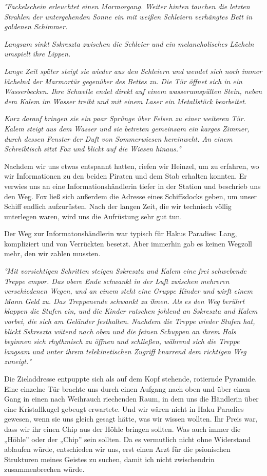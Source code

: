\documentclass[11pt]{scrartcl}
\begin{document}
\emph{°Fackelschein erleuchtet einen Marmorgang. Weiter hinten tauchen
die letzten Strahlen der untergehenden Sonne ein mit weißen Schleiern
verhängtes Bett in goldenen Schimmer.}

\emph{Langsam sinkt Sskreszta zwischen die Schleier und ein
melancholisches Lächeln umspielt ihre Lippen.}

\emph{Lange Zeit später steigt sie wieder aus den Schleiern und wendet
sich noch immer lächelnd der Marmortür gegenüber des Bettes zu. Die Tür
öffnet sich in ein Wasserbecken. Ihre Schwelle endet direkt auf einem
wasserumspülten Stein, neben dem Kalem im Wasser treibt und mit einem
Laser ein Metallstück bearbeitet.}

\emph{Kurz darauf bringen sie ein paar Sprünge über Felsen zu einer
weiteren Tür. Kalem steigt aus dem Wasser und sie betreten gemeinsam ein
karges Zimmer, durch dessen Fenster der Duft von Sommerwiesen
hereinweht. An einem Schreibtisch sitzt Fox und blickt auf die Wiesen
hinaus.°}

Nachdem wir uns etwas entspannt hatten, riefen wir Heinzel, um zu
erfahren, wo wir Informationen zu den beiden Piraten und dem Stab
erhalten konnten. Er verwies uns an eine Informationshändlerin tiefer in
der Station und beschrieb uns den Weg. Fox ließ sich außerdem die
Adresse eines Schiffsdocks geben, um unser Schiff endlich aufzurüsten.
Nach der langen Zeit, die wir technisch völlig unterlegen waren, wird
uns die Aufrüstung sehr gut tun.

Der Weg zur Informatonshändlerin war typisch für Hakus Paradies: Lang,
kompliziert und von Verrückten besetzt. Aber immerhin gab es keinen
Wegzoll mehr, den wir zahlen mussten.

\emph{°Mit vorsichtigen Schritten steigen Sskreszta und Kalem eine frei
schwebende Treppe empor. Das obere Ende schwankt in der Luft zwischen
mehreren verschiedenen Wegen, und an einem steht eine Gruppe Kinder und
wirft einem Mann Geld zu. Das Treppenende schwankt zu ihnen. Als es den
Weg berührt klappen die Stufen ein, und die Kinder rutschen johlend an
Sskreszta und Kalem vorbei, die sich am Geländer festhalten. Nachdem die
Treppe wieder Stufen hat, blickt Sskreszta wütend nach oben und die
feinen Schuppen an ihrem Hals beginnen sich rhythmisch zu öffnen und
schließen, während sich die Treppe langsam und unter ihrem
telekinetischen Zugriff knarrend dem richtigen Weg zuneigt.°}

Die Zieladdresse entpuppte sich als auf dem Kopf stehende, rotiernde
Pyramide. Eine einzelne Tür brachte uns durch einen Aufgang nach oben
und über einen Gang in einen nach Weihrauch riechenden Raum, in dem uns
die Händlerin über eine Kristallkugel gebeugt erwartete. Und wir wären
nicht in Haku Paradies gewesen, wenn sie uns gleich gesagt hätte, was
wir wissen wollten. Ihr Preis war, dass wir ihr einen Chip aus der Höhle
bringen sollten. Was auch immer die „Höhle'' oder der „Chip'' sein
sollten. Da es vermutlich nicht ohne Widerstand ablaufen würde,
entschieden wir uns, erst einen Arzt für die psionischen Strukturen
meines Geistes zu suchen, damit ich nicht zwischendrin zusammenbrechen
würde.
\end{document}
